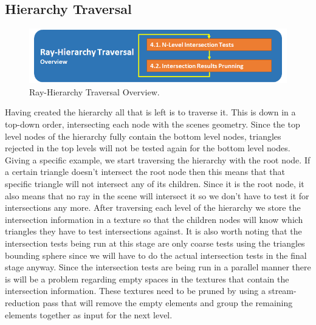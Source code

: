 \documentclass{llncs}
\begin{document}
\newpage

%
\subsection{Hierarchy Traversal}
%

\begin{figure}
\centering
\includegraphics[scale=0.60]{images/figure 5.png}
\caption{Ray-Hierarchy Traversal Overview.}
\end{figure}

Having created the hierarchy all that is left is to traverse it. This is down in a top-down order, intersecting each node with the scenes geometry. Since the top level nodes of the hierarchy fully contain the bottom level nodes, triangles rejected in the top levels will not be tested again for the bottom level nodes. Giving a specific example, we start traversing the hierarchy with the root node. If a certain triangle doesn't intersect the root node then this means that that specific triangle will not intersect any of its children. Since it is the root node, it also means that no ray in the scene will intersect it so we don't have to test it for intersections any more. After traversing each level of the hierarchy we store the intersection information in a texture so that the children nodes will know which triangles they have to test intersections against. It is also worth noting that the intersection tests being run at this stage are only coarse tests using the triangles bounding sphere since we will have to do the actual intersection tests in the final stage anyway. Since the intersection tests are being run in a parallel manner there is will be a problem regarding empty spaces in the textures that contain the intersection information. These textures need to be pruned by using a stream-reduction pass \cite{RAHStream07} that will remove the empty elements and group the remaining elements together as input for the next level.
\end{document}
